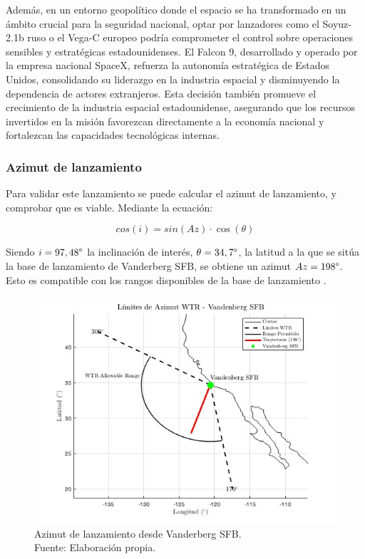 Además, en un entorno geopolítico donde el espacio se ha transformado en un ámbito crucial para la seguridad nacional, optar por lanzadores como el Soyuz-2.1b ruso o el Vega-C europeo podría comprometer el control sobre operaciones sensibles y estratégicas estadounidenses. El Falcon 9, desarrollado y operado por la empresa nacional SpaceX, refuerza la autonomía estratégica de Estados Unidos, consolidando su liderazgo en la industria espacial y disminuyendo la dependencia de actores extranjeros. Esta decisión también promueve el crecimiento de la industria espacial estadounidense, asegurando que los recursos invertidos en la misión favorezcan directamente a la economía nacional y fortalezcan las capacidades tecnológicas internas.

\subsubsection{Azimut de lanzamiento}

Para validar este lanzamiento se puede calcular el azimut de lanzamiento, y comprobar que es viable. Mediante la ecuación:

\begin{equation}
    cos (i) = sin(Az) \cdot \cos(\theta)
\end{equation}

Siendo $i= 97,48 \degree$ la inclinación de interés, $\theta=34,7 \degree$, la latitud a la que se sitúa la base de lanzamiento de Vanderberg SFB, se obtiene un azimut $Az = 198 \degree$. Esto es compatible con los rangos disponibles de la base de lanzamiento \cite{karabeyoglu2018lecture7}.
\begin{figure}[H]
    \centering
    \includegraphics[width=0.7\linewidth]{6.Lanzadores/azimuth.jpg}
    \caption{Azimut de lanzamiento desde Vanderberg SFB. \\Fuente: Elaboración propia.}
    \label{fig:azimut}
\end{figure}

